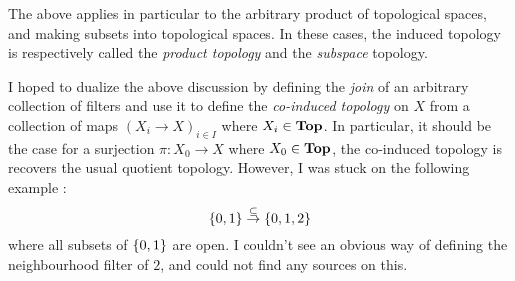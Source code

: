 \documentclass[main.tex]{subfiles}
\begin{document}
\begin{rmk}
  The above applies in particular to the 
  arbitrary product of topological spaces,
  and making subsets into topological spaces.  
  In these cases, the induced topology is respectively called 
  the \emph{product topology} and the \emph{subspace} topology. 

  I hoped to dualize the above discussion by 
  defining the \emph{join} of an arbitrary collection of filters and 
  use it to define the \emph{co-induced topology} on $X$ from 
  a collection of maps $(X_i \to X)_{i\in I}$ where $X_i \in \mathbf{Top}$.
  In particular, it should be the case
  for a surjection $\pi : X_0 \to X$ where $X_0 \in \mathbf{Top}$,
  the co-induced topology is recovers the usual quotient topology.
  However, I was stuck on the following example : 
  \[
    \left\{0,1\right\} \overset{\subseteq}{\to} \left\{0,1,2\right\}
  \]
  where all subsets of $\left\{0,1\right\}$ are open. 
  I couldn't see an obvious way of defining the neighbourhood filter of $2$,
  and could not find any sources on this.
\end{rmk}
\end{document}
